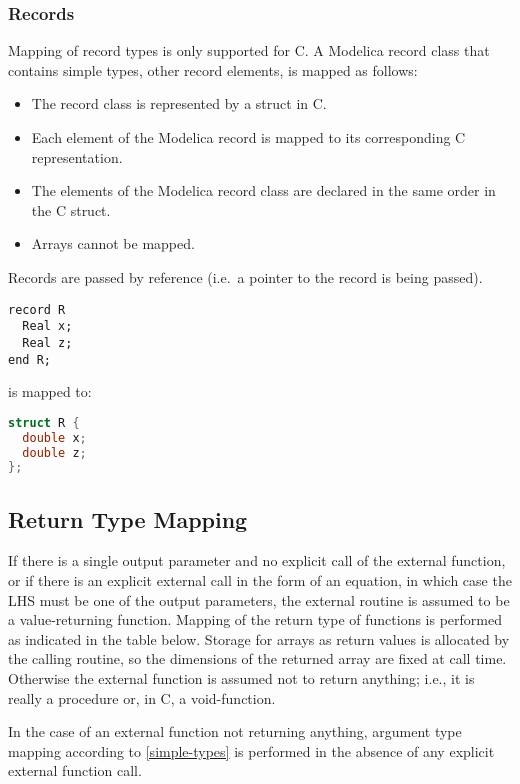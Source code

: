 \subsubsection{Records}

Mapping of record types is only supported for C. A Modelica record class
that contains simple types, other record elements, is mapped as follows:
\begin{itemize}
\item
  The record class is represented by a struct in C.
\item
  Each element of the Modelica record is mapped to its corresponding C
  representation.
\item
  The elements of the Modelica record class are declared in the same
  order in the C struct.
\item
  Arrays cannot be mapped.
\end{itemize}

Records are passed by reference (i.e.\ a pointer to the record is being
passed).

\begin{example}
\begin{lstlisting}[language=modelica]
record R
  Real x;
  Real z;
end R;
\end{lstlisting}
is mapped to:
\begin{lstlisting}[language=C]
struct R {
  double x;
  double z;
};
\end{lstlisting}
\end{example}

\subsection{Return Type Mapping}

If there is a single output parameter and no explicit call of the
external function, or if there is an explicit external call in the form
of an equation, in which case the LHS must be one of the output
parameters, the external routine is assumed to be a value-returning
function. Mapping of the return type of functions is performed as
indicated in the table below. Storage for arrays as return values is
allocated by the calling routine, so the dimensions of the returned
array are fixed at call time. Otherwise the external function is assumed
not to return anything; i.e., it is really a procedure or, in C, a
void-function.

\begin{nonnormative}
In the case of an external function not returning anything, argument type mapping according to \autoref{simple-types} is performed in the absence
of any explicit external function call.
\end{nonnormative}

